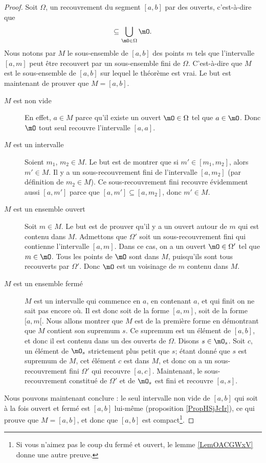 \begin{proof}
	Soit \( \Omega\), un recouvrement du segment \( [a,b]\) par des ouverts, c'est-à-dire que
	\begin{equation}
		[a,b]\subseteq\bigcup_{\mO\in\Omega}\mO.
	\end{equation}
	Nous notons par \( M\) le sous-ensemble de \( [a,b]\) des points \( m\) tels que l'intervalle \( [a,m]\) peut être recouvert par un sous-ensemble fini de \( \Omega\). C'est-à-dire que \( M\) est le sous-ensemble de \( [a,b]\) sur lequel le théorème est vrai. Le but est maintenant de prouver que \( M=[a,b]\).
	\begin{description}
		\item[$M$ est non vide] En effet, \( a\in M\) parce qu'il existe un ouvert \( \mO\in\Omega\) tel que \( a\in\mO\). Donc \( \mO\) tout seul recouvre l'intervalle \( [a,a]\).
		\item[$M$ est un intervalle] Soient \( m_1\), \( m_2\in M\). Le but est de montrer que si \( m'\in[m_1,m_2]\), alors \( m'\in M\). Il y a un sous-recouvrement fini de l'intervalle \( [a,m_2]\) (par définition de \( m_2\in M\)). Ce sous-recouvrement fini recouvre évidemment aussi \( [a,m']\) parce que \( [a,m']\subseteq [a,m_2]\), donc \( m'\in M\).
		\item[$M$ est un ensemble ouvert] Soit \( m\in M\). Le but est de prouver qu'il y a un ouvert autour de \( m\) qui est contenu dans \( M\). Admettons que \( \Omega'\) soit un sous-recouvrement fini qui contienne l'intervalle \( [a,m]\). Dans ce cas, on a un ouvert \( \mO\in\Omega'\) tel que \( m\in\mO\). Tous les points de \( \mO\) sont dans \( M\), puisqu'ils sont tous recouverts par \( \Omega'\). Donc \( \mO\) est un voisinage de \( m\) contenu dans \( M\).
		\item[$M$ est un ensemble fermé] \( M\) est un intervalle qui commence en \( a\), en contenant \( a\), et qui finit on ne sait pas encore où. Il est donc soit de la forme \( [a,m]\), soit de la forme \( [a,m[\). Nous allons montrer que \( M\) est de la première forme en démontrant que \( M\) contient son supremum \( s\). Ce supremum est un élément de \( [a,b]\), et donc il est contenu dans un des ouverts de \( \Omega\). Disons \( s\in\mO_s\). Soit \( c\), un élément de \( \mO_s\) strictement plus petit que \( s\); étant donné que \( s\) est supremum de \( M\), cet élément \( c\) est dans \( M\), et donc on a un sous-recouvrement fini \( \Omega'\) qui recouvre \( [a,c]\). Maintenant, le sous-recouvrement constitué de \( \Omega'\) et de \( \mO_s\) est fini et recouvre \( [a,s]\).
	\end{description}
	Nous pouvons maintenant conclure : le seul intervalle non vide de \( [a,b]\) qui soit à la fois ouvert et fermé est \( [a,b]\) lui-même (proposition \ref{PropHSjJcIr}), ce qui prouve que \( M=[a,b]\),
	et donc que \( [a,b]\) est compact\footnote{Si vous n'aimez pas le coup du fermé et ouvert, le lemme \ref{LemOACGWxV} donne une autre preuve.}.
\end{proof}


